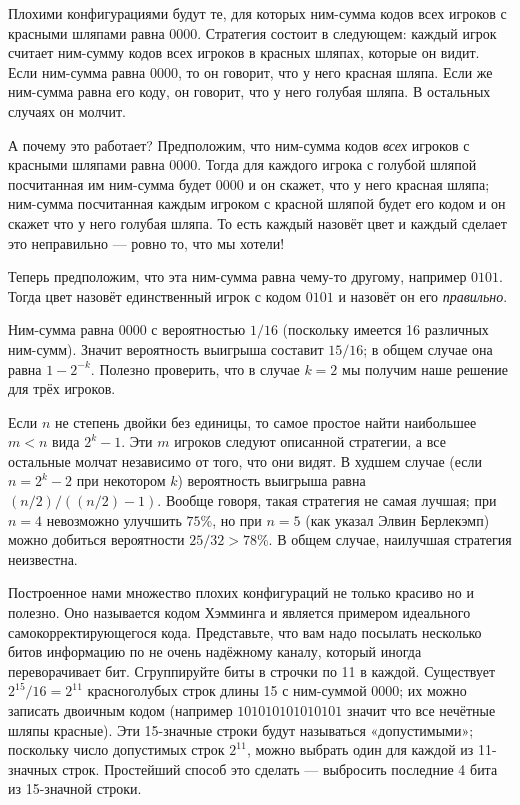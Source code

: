 Плохими конфигурациями будут те, для которых ним-сумма кодов всех игроков с красными шляпами равна $0000$.
Стратегия состоит в следующем: каждый игрок считает ним-сумму кодов всех игроков в красных шляпах, которые он видит.
Если ним-сумма равна $0000$, то он говорит, что у него красная шляпа.
Если же ним-сумма равна его коду, он говорит, что у него голубая шляпа.
В остальных случаях он молчит.

А почему это работает?
Предположим, что ним-сумма кодов \emph{всех} игроков с красными шляпами равна $0000$.
Тогда для каждого игрока с голубой шляпой посчитанная им ним-сумма будет $0000$ и он скажет, что у него красная шляпа;
ним-сумма посчитанная каждым игроком с красной шляпой будет его кодом и он скажет что у него голубая шляпа.
То есть каждый назовёт цвет и каждый сделает это неправильно --- ровно то, что мы хотели!

Теперь  предположим, что эта ним-сумма равна чему-то другому, например $0101$.
Тогда цвет назовёт единственный игрок с кодом  $0101$ и назовёт он его \emph{правильно}.

Ним-сумма равна $0000$ с вероятностью $1/16$ (поскольку имеется 16 различных ним-сумм).
Значит вероятность выигрыша составит $15/16$;
в общем случае она равна $1-2^{-k}$.
Полезно проверить, что в случае $k=2$ мы получим наше решение для трёх игроков.

Если $n$ не степень двойки без единицы, то самое простое найти наибольшее $m<n$ вида $2^k-1$.
Эти $m$ игроков следуют описанной стратегии, а все остальные молчат независимо от того, что они видят.
В худшем случае (если $n=2^k-2$ при некотором $k$) вероятность выигрыша равна $(n/2)/((n/2)-1)$.
Вообще говоря, такая стратегия не самая лучшая;
при $n=4$ невозможно улучшить $75\%$, но при $n=5$ (как указал Элвин Берлекэмп) можно добиться вероятности $25/32>78\%$.
В общем случае, наилучшая стратегия неизвестна.
\heart

Построенное нами множество плохих конфигураций не только красиво но и полезно.
Оно называется кодом Хэмминга и является примером идеального самокорректирующегося кода.
Представьте, что вам надо посылать несколько битов информацию по не очень надёжному каналу, который иногда переворачивает бит.
Сгруппируйте биты в строчки по 11 в каждой.
Существует $2^{15}/16=2^{11}$ красноголубых строк длины 15 с ним-суммой $0000$;
их можно записать двоичным кодом (например $101010101010101$ значит что все нечётные шляпы красные).
Эти 15-значные строки будут называться «допустимыми»;
поскольку число допустимых строк $2^{11}$, можно выбрать один для каждой из 11-значных строк.
Простейший способ это сделать --- выбросить последние 4 бита из 15-значной строки.

